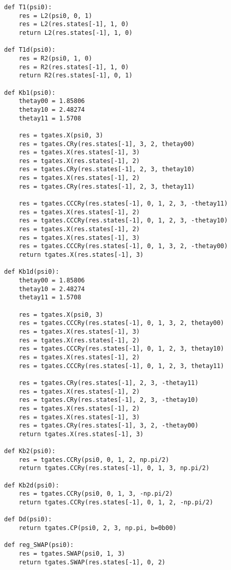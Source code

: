 \begin{verbatim}
def T1(psi0):
    res = L2(psi0, 0, 1)
    res = L2(res.states[-1], 1, 0)
    return L2(res.states[-1], 1, 0)

def T1d(psi0):
    res = R2(psi0, 1, 0)
    res = R2(res.states[-1], 1, 0)
    return R2(res.states[-1], 0, 1)

def Kb1(psi0):
    thetay00 = 1.85806
    thetay10 = 2.48274
    thetay11 = 1.5708

    res = tgates.X(psi0, 3)
    res = tgates.CRy(res.states[-1], 3, 2, thetay00)
    res = tgates.X(res.states[-1], 3)
    res = tgates.X(res.states[-1], 2)
    res = tgates.CRy(res.states[-1], 2, 3, thetay10)
    res = tgates.X(res.states[-1], 2)
    res = tgates.CRy(res.states[-1], 2, 3, thetay11)

    res = tgates.CCCRy(res.states[-1], 0, 1, 2, 3, -thetay11)
    res = tgates.X(res.states[-1], 2)
    res = tgates.CCCRy(res.states[-1], 0, 1, 2, 3, -thetay10)
    res = tgates.X(res.states[-1], 2)
    res = tgates.X(res.states[-1], 3)
    res = tgates.CCCRy(res.states[-1], 0, 1, 3, 2, -thetay00)
    return tgates.X(res.states[-1], 3)

def Kb1d(psi0):
    thetay00 = 1.85806
    thetay10 = 2.48274
    thetay11 = 1.5708

    res = tgates.X(psi0, 3)
    res = tgates.CCCRy(res.states[-1], 0, 1, 3, 2, thetay00)
    res = tgates.X(res.states[-1], 3)
    res = tgates.X(res.states[-1], 2)
    res = tgates.CCCRy(res.states[-1], 0, 1, 2, 3, thetay10)
    res = tgates.X(res.states[-1], 2)
    res = tgates.CCCRy(res.states[-1], 0, 1, 2, 3, thetay11)

    res = tgates.CRy(res.states[-1], 2, 3, -thetay11)
    res = tgates.X(res.states[-1], 2)
    res = tgates.CRy(res.states[-1], 2, 3, -thetay10)
    res = tgates.X(res.states[-1], 2)
    res = tgates.X(res.states[-1], 3)
    res = tgates.CRy(res.states[-1], 3, 2, -thetay00)
    return tgates.X(res.states[-1], 3)

def Kb2(psi0):
    res = tgates.CCRy(psi0, 0, 1, 2, np.pi/2)
    return tgates.CCRy(res.states[-1], 0, 1, 3, np.pi/2)

def Kb2d(psi0):
    res = tgates.CCRy(psi0, 0, 1, 3, -np.pi/2)
    return tgates.CCRy(res.states[-1], 0, 1, 2, -np.pi/2)

def Dd(psi0):
    return tgates.CP(psi0, 2, 3, np.pi, b=0b00)

def reg_SWAP(psi0):
    res = tgates.SWAP(psi0, 1, 3)
    return tgates.SWAP(res.states[-1], 0, 2)



\end{verbatim}
